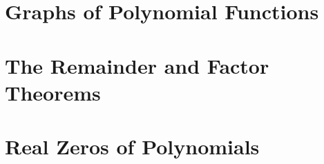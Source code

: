 \section{Graphs of Polynomial Functions}



\newpage

\section{The Remainder and Factor Theorems}



\newpage

\section{Real Zeros of Polynomials}



\newpage
\begin{comment}

\section{Complex Zeros and the Fundamental Theorem of Algebra}


\end{comment}
\newpage
